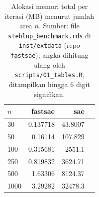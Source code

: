 \begin{table}[htbp]
\centering
\caption{Alokasi memori total per iterasi (MB) menurut jumlah area $n$. Sumber: file \texttt{steblup\_benchmark.rds} di \texttt{inst/extdata} (repo \texttt{fastsae}); angka dihitung ulang oleh \texttt{scripts/01\_tables.R}, ditampilkan hingga 6 digit signifikan.}
\label{tab:mem-stfh}
\small
\begin{tabular}{lrrr}
\toprule
$n$ & fastsae & sae \\
\midrule
30 & 0.137718 & 43.8007 \\
50 & 0.16114 & 107.829 \\
100 & 0.315681 &  2551.1 \\
250 & 0.819832 & 3624.71 \\
500 & 1.63306 & 8124.37 \\
1000 & 3.29282 & 32478.3 \\
\bottomrule
\end{tabular}
\end{table}

